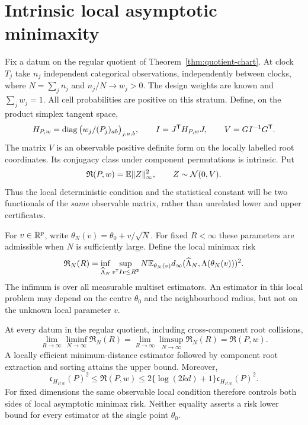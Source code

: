 \section{Intrinsic local asymptotic minimaxity}
\label{sec:local-minimax}
Fix a datum on the regular quotient of
Theorem~\ref{thm:quotient-chart}. At clock $T_j$ take $n_j$ independent
categorical observations, independently between clocks, where
$N=\sum_j n_j$ and $n_j/N\to w_j>0$. The design weights are known and
$\sum_jw_j=1$. All cell probabilities are positive on this stratum.
Define, on the product simplex tangent space,
\begin{equation}\label{eq:fisher-object}
 H_{P,w}=\operatorname{diag}\big(w_j/(P_j)_{ab}\big)_{j,a,b},\qquad
 I=J^{\mathsf T}H_{P,w}J,\qquad
 V=GI^{-1}G^{\mathsf T}.
\end{equation}
The matrix $V$ is an observable positive definite form on the locally
labelled root coordinates. Its conjugacy class under component
permutations is intrinsic. Put
\begin{equation}\label{eq:gaussian-risk-object}
 \mathfrak R(P,w)=\mathbb E\|Z\|_\infty^2,
                  \qquad Z\sim\mathcal N(0,V).
\end{equation}
Thus the local deterministic condition and the statistical constant
will be two functionals of the \emph{same} observable matrix, rather
than unrelated lower and upper certificates.

For $v\in\mathbb R^p$, write $\theta_N(v)=\theta_0+v/\sqrt N$. For fixed
$R<\infty$ these parameters are admissible when $N$ is sufficiently
large. Define the local minimax risk
\begin{equation}\label{eq:local-risk-definition}
 \mathfrak R_N(R)=\inf_{\widehat\Lambda_N}
   \sup_{v^{\mathsf T}Iv\le R^2}
   N\mathbb E_{\theta_N(v)}
       d_\infty(\widehat\Lambda_N,\Lambda(\theta_N(v)))^2.
\end{equation}
The infimum is over all measurable multiset estimators. An estimator
in this local problem may depend on the centre $\theta_0$ and the
neighbourhood radius, but not on the unknown local parameter $v$.

\begin{theorem}\label{thm:local-minimax}
At every datum in the regular quotient, including cross-component
root collisions,
\begin{equation}\label{eq:local-minimax-equality}
 \lim_{R\to\infty}\liminf_{N\to\infty}\mathfrak R_N(R)
 =\lim_{R\to\infty}\limsup_{N\to\infty}\mathfrak R_N(R)
 =\mathfrak R(P,w).
\end{equation}
A locally efficient minimum-distance estimator followed by component
root extraction and sorting attains the upper bound. Moreover,
\begin{equation}\label{eq:metric-risk-comparison}
 \mathfrak c_{H_{P,w}}(P)^2
 \le \mathfrak R(P,w)
 \le 2\{\log(2kd)+1\}\mathfrak c_{H_{P,w}}(P)^2.
\end{equation}
For fixed dimensions the same observable local condition therefore
controls both sides of local asymptotic minimax risk. Neither equality
asserts a risk lower bound for every estimator at the single point
$\theta_0$.
\end{theorem}

